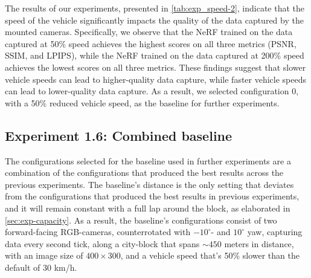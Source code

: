 The results of our experiments, presented in \autoref{tab:exp_speed-2}, indicate that the speed of the vehicle significantly impacts the quality of the data captured by the mounted cameras. Specifically, we observe that the NeRF trained on the data captured at 50\% speed achieves the highest scores on all three metrics (PSNR, SSIM, and LPIPS), while the NeRF trained on the data captured at 200\% speed achieves the lowest scores on all three metrics. These findings suggest that slower vehicle speeds can lead to higher-quality data capture, while faster vehicle speeds can lead to lower-quality data capture. As a result, we selected configuration 0, with a 50\% reduced vehicle speed, as the baseline for further experiments.
















\subsection{Experiment 1.6: Combined baseline}
The configurations selected for the baseline used in further experiments are a combination of the configurations that produced the best results across the previous experiments. The baseline’s distance is the only setting that deviates from the configurations that produced the best results in previous experiments, and it will remain constant with a full lap around the block, as elaborated in \autoref{sec:exp-capacity}. As a result, the baseline's configurations consist of two forward-facing RGB-cameras, counterrotated with $-10^\circ$- and $10^\circ$ yaw, capturing data every second tick, along a city-block that spans $\sim450$ meters in distance, with an image size of $400 \times 300$, and a vehicle speed that's 50\% slower than the default of 30 km/h. 

